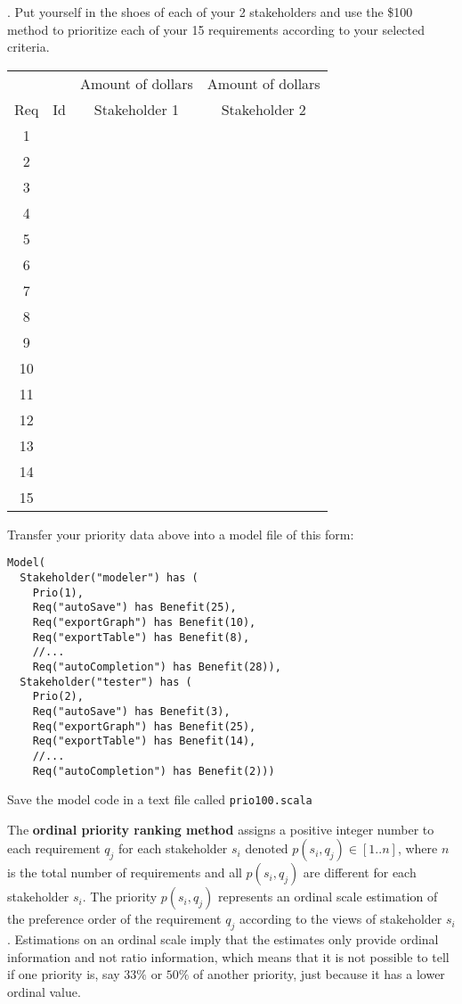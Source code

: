 \documentclass[11pt]{article}
\begin{document}
 \clearpage\newpage 
\begin{framed}
. Put yourself in the shoes of each of your 2 stakeholders and use the \$100 method to prioritize each of your 15 requirements according to your selected criteria. 

\vspace{1em}

\begin{tabular}{| c | p{3cm} | c | c |}
\hline
          &     & Amount of dollars & Amount of dollars \\ 
 Req    & Id & Stakeholder 1 & Stakeholder 2 \\ \hline
\hline 1 & & &  \\ 
\hline 2 & & & \\
\hline 3 & &  &\\
\hline 4 & &  &\\
\hline 5 & &  &\\
\hline 6 & &  &\\
\hline 7 & & & \\
\hline 8 & & & \\
\hline 9 & &  &\\
\hline 10 & &  &\\
\hline 11 & &  &\\
\hline 12 & &  &\\
\hline 13 & & & \\
\hline 14 & & & \\
\hline 15 & & & \\
\hline
\end{tabular}

\vspace{2em}
\noindent Transfer your priority data above into a model file of this form:
\begin{lstlisting}
Model(
  Stakeholder("modeler") has (
    Prio(1),
    Req("autoSave") has Benefit(25),
    Req("exportGraph") has Benefit(10),
    Req("exportTable") has Benefit(8), 
    //...
    Req("autoCompletion") has Benefit(28)),
  Stakeholder("tester") has (
    Prio(2),
    Req("autoSave") has Benefit(3),
    Req("exportGraph") has Benefit(25),
    Req("exportTable") has Benefit(14), 
    //...
    Req("autoCompletion") has Benefit(2)))
 \end{lstlisting}
 Save the model code in a text file called \verb+prio100.scala+   
 \end{framed}

\clearpage\newpage
\noindent The {\bf ordinal priority ranking method} assigns a positive integer number to each requirement $q_j$ for each stakeholder $s_i$ denoted $p(s_i, q_j) \in [1..n]$, where $n$ is the total number of requirements and all $p(s_i, q_j)$ are different for each stakeholder $s_i$. The priority $p(s_i, q_j)$ represents an ordinal scale estimation of the preference order of the requirement $q_j$ according to the views of stakeholder $s_i$. Estimations on an ordinal scale imply that the estimates only provide ordinal information and not ratio information, which means that it is not possible to tell if one priority is, say $33\%$ or $50\%$ of another priority, just because it has a lower ordinal value. 
\end{document}
